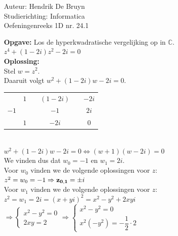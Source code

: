 \documentclass[a4paper]{article}
\begin{document}
  
\noindent \large Auteur: Hendrik De Bruyn \\
\noindent \large Studierichting: Informatica\\
\noindent \large Oefeningenreeks 1D nr. 24.1\\

\medskip

\normalsize

\textbf{Opgave:} Los de hyperkwadratische vergelijking op in $\mathbb{C}$. \\

$z^4 + (1-2i)z^2 -2i = 0$ \\

\textbf{Oplossing:} \\

Stel $w = z^2$. \\

Daaruit volgt $w^2 + (1-2i)w -2i = 0$. \\

\begin{tabular}{c|ccccc}
         & $1$ && $(1-2i)$ &       & $-2i$ \\
    $-1$ &     && $-1$      &       & $2i$  \\ \hline
         & $1$ && $-2i$     &\vline & $0$   \\
\end{tabular} \\

$w^2 + (1-2i)w -2i = 0 \Leftrightarrow (w+1)(w-2i) = 0$ \\

We vinden dus dat $w_0 = -1$ en $w_1 = 2i$. \\

Voor $w_0$ vinden we de volgende oplossingen voor $z$: \\

$z^2 = w_0 = -1 \Rightarrow {\bf z_{0, 1}} = \pm i$ \\

Voor $w_1$ vinden we de volgende oplossingen voor $z$: \\

$z^2 = w_1 = 2i = (x+yi)^2 = x^2 - y^2 + 2xyi$ \\

$\Rightarrow \left\{\begin{array}{l}
    x^2 - y^2 = 0 \\
    2xy = 2
\end{array}\right. \Rightarrow \left\{\begin{array}{l}
    x^2 - y^2 = 0 \\
    x^2(-y^2) = -\dfrac{1}{2} \cdot 2
\end{array}\right.$ \\
\end{document}
